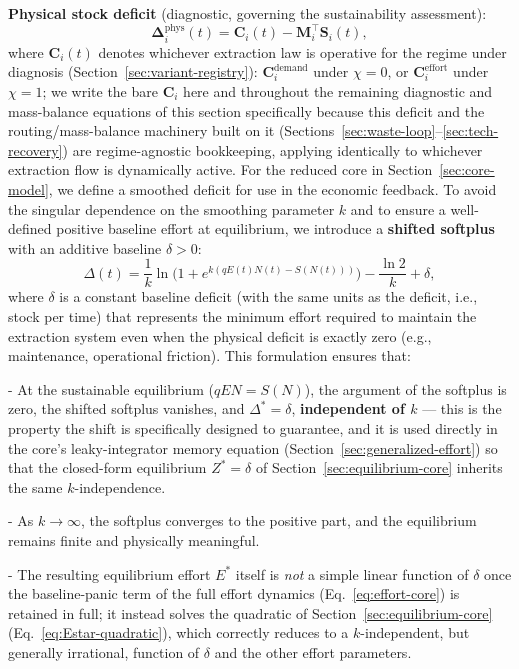 \documentclass[twocolumn,10pt]{article}
\begin{document}
\textbf{Physical stock deficit} (diagnostic, governing the sustainability assessment):
\[
\boldsymbol{\Delta}_{i}^{\text{phys}}(t) = \mathbf{C}_i(t) - \mathbf{M}_i^\top \mathbf{S}_i(t),
\]
where $\mathbf C_i(t)$ denotes whichever extraction law is operative for the regime under diagnosis (Section~\ref{sec:variant-registry}): $\mathbf C_i^{\text{demand}}$ under $\chi=0$, or $\mathbf C_i^{\text{effort}}$ under $\chi=1$; we write the bare $\mathbf C_i$ here and throughout the remaining diagnostic and mass-balance equations of this section specifically because this deficit and the routing/mass-balance machinery built on it (Sections~\ref{sec:waste-loop}--\ref{sec:tech-recovery}) are regime-agnostic bookkeeping, applying identically to whichever extraction flow is dynamically active.
For the reduced core in Section~\ref{sec:core-model}, we define a smoothed deficit for use in the economic feedback. To avoid the singular dependence on the smoothing parameter \(k\) and to ensure a well-defined positive baseline effort at equilibrium, we introduce a \textbf{shifted softplus} with an additive baseline \(\delta > 0\):
\[
\Delta(t) = \frac{1}{k}\ln\!\bigl(1 + e^{k(qE(t)N(t) - S(N(t)))}\bigr) - \frac{\ln 2}{k} + \delta,
\]
where \(\delta\) is a constant baseline deficit (with the same units as the deficit, i.e., stock per time) that represents the minimum effort required to maintain the extraction system even when the physical deficit is exactly zero (e.g., maintenance, operational friction). This formulation ensures that:

- At the sustainable equilibrium (\(qEN = S(N)\)), the argument of the softplus is zero, the shifted softplus vanishes, and \(\Delta^* = \delta\), \textbf{independent of \(k\)} — this is the property the shift is specifically designed to guarantee, and it is used directly in the core's leaky-integrator memory equation (Section~\ref{sec:generalized-effort}) so that the closed-form equilibrium $Z^*=\delta$ of Section~\ref{sec:equilibrium-core} inherits the same $k$-independence.

- As \(k \to \infty\), the softplus converges to the positive part, and the equilibrium remains finite and physically meaningful.

- The resulting equilibrium effort \(E^*\) itself is \emph{not} a simple linear function of \(\delta\) once the baseline-panic term of the full effort dynamics (Eq.~\eqref{eq:effort-core}) is retained in full; it instead solves the quadratic of Section~\ref{sec:equilibrium-core} (Eq.~\eqref{eq:Estar-quadratic}), which correctly reduces to a $k$-independent, but generally irrational, function of $\delta$ and the other effort parameters.
\end{document}
